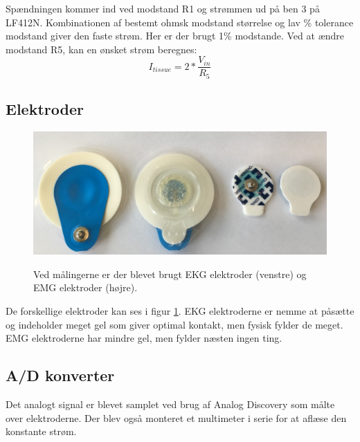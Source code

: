 Spændningen kommer ind ved modstand R1 og strømmen ud på ben 3 på LF412N. Kombinationen af bestemt ohmsk modstand størrelse og lav \% tolerance modstand giver den faste strøm. Her er der brugt 1\% modstande. Ved at ændre modstand R5, kan en ønsket strøm beregnes\cite{Aroom2009}: $$I_{tissue}=2*\frac{V_{in}}{R_{5}}$$


\subsection{Elektroder}

\begin{figure}[H]
\centering
{\includegraphics[width=12cm]
{Figure/elektroder}}
\caption{Ved målingerne er der blevet brugt EKG elektroder (venstre) og EMG elektroder (højre).}
\label{fig:elektroder}
\end{figure}

De forskellige elektroder kan ses i figur \ref{fig:elektroder}. EKG elektroderne er nemme at påsætte og indeholder meget gel som giver optimal kontakt, men fysisk fylder de meget. EMG elektroderne har mindre gel, men fylder næsten ingen ting. 






\subsection{A/D konverter}

Det analogt signal er blevet samplet ved brug af Analog Discovery som målte over elektroderne. Der blev også monteret et multimeter i serie for at aflæse den konstante strøm.


